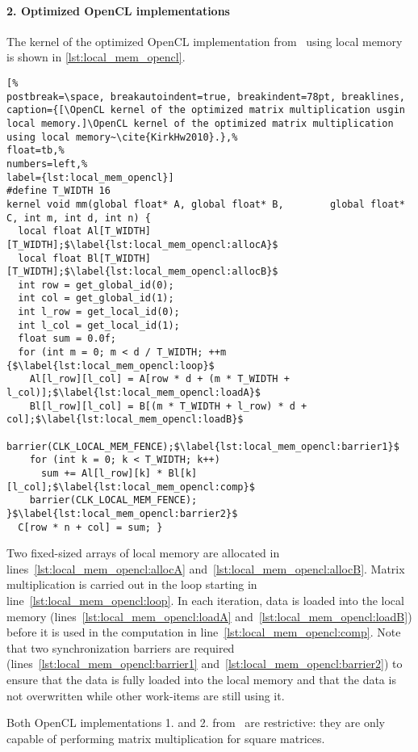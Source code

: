 \paragraph{2. Optimized OpenCL implementations}
The kernel of the optimized OpenCL implementation from~\cite{KirkHw2010} using local memory is shown in \autoref{lst:local_mem_opencl}.
\begin{lstlisting}[%                                                             
postbreak=\space, breakautoindent=true, breakindent=78pt, breaklines,
caption={[\OpenCL kernel of the optimized matrix multiplication usgin local memory.]\OpenCL kernel of the optimized matrix multiplication using local memory~\cite{KirkHw2010}.},%
float=tb,%
numbers=left,%
label={lst:local_mem_opencl}]
#define T_WIDTH 16
kernel void mm(global float* A, global float* B,        global float* C, int m, int d, int n) {
  local float Al[T_WIDTH][T_WIDTH];$\label{lst:local_mem_opencl:allocA}$
  local float Bl[T_WIDTH][T_WIDTH];$\label{lst:local_mem_opencl:allocB}$
  int row = get_global_id(0);
  int col = get_global_id(1);
  int l_row = get_local_id(0);
  int l_col = get_local_id(1);
  float sum = 0.0f;
  for (int m = 0; m < d / T_WIDTH; ++m {$\label{lst:local_mem_opencl:loop}$
    Al[l_row][l_col] = A[row * d + (m * T_WIDTH + l_col)];$\label{lst:local_mem_opencl:loadA}$
    Bl[l_row][l_col] = B[(m * T_WIDTH + l_row) * d + col];$\label{lst:local_mem_opencl:loadB}$
    barrier(CLK_LOCAL_MEM_FENCE);$\label{lst:local_mem_opencl:barrier1}$
    for (int k = 0; k < T_WIDTH; k++)
      sum += Al[l_row][k] * Bl[k][l_col];$\label{lst:local_mem_opencl:comp}$
    barrier(CLK_LOCAL_MEM_FENCE); }$\label{lst:local_mem_opencl:barrier2}$
  C[row * n + col] = sum; }
\end{lstlisting}
Two fixed-sized arrays of local memory are allocated in lines~\ref{lst:local_mem_opencl:allocA} and~\ref{lst:local_mem_opencl:allocB}.
Matrix multiplication is carried out in the loop starting in line~\ref{lst:local_mem_opencl:loop}.
In each iteration, data is loaded into the local memory (lines~\ref{lst:local_mem_opencl:loadA} and~\ref{lst:local_mem_opencl:loadB}) before it is used in the computation in line~\ref{lst:local_mem_opencl:comp}.
Note that two synchronization barriers are required (lines~\ref{lst:local_mem_opencl:barrier1} and~\ref{lst:local_mem_opencl:barrier2}) to ensure that the data is fully loaded into the local memory and that the data is not overwritten while other work-items are still using it.

Both OpenCL implementations 1. and 2. from~\cite{KirkHw2010} are restrictive:
they are only capable of performing matrix multiplication for square matrices.

